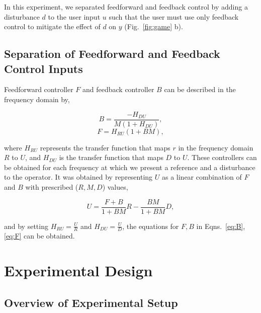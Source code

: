 \documentclass{ifacconf}
\begin{document}
In this experiment, we separated feedforward and feedback control by adding a disturbance $d$ to the user input $u$ such that the user must use only feedback control to mitigate the effect of $d$ on $y$ (Fig.~\ref{fig:game} b).

\subsection{Separation of Feedforward and Feedback Control Inputs}

Feedforward controller $F$ and feedback controller $B$ can be described in the frequency domain by, 

\begin{equation} \label{eq:B}
{B=\frac{-H_{DU}}{M(1+H_{DU})}},
\end{equation}
\begin{equation} \label{eq:F}
{F=H_{RU}(1+BM)},
\end{equation}

where $H_{RU}$ represents the transfer function that maps $r$ in the frequency domain $R$ to $U$, and $H_{DU}$ is the transfer function that maps $D$ to $U$. These controllers can be obtained for each frequency at which we present a reference and a disturbance to the operator. It was obtained by representing $U$ as a linear combination of $F$ and $B$ with prescribed ($R, M, D$) values, 

\begin{equation} \label{eq:U}
{U=\frac{F+B}{1+BM}R-\frac{BM}{1+BM}D},
\end{equation}

and by setting $H_{RU}=\frac{U}{R}$ and $H_{DU}=\frac{U}{D}$, the equations for $F,B$ in Eqns.~\ref{eq:B}, \ref{eq:F} can be obtained.

\section{Experimental Design}
\subsection{Overview of Experimental Setup}
\end{document}
